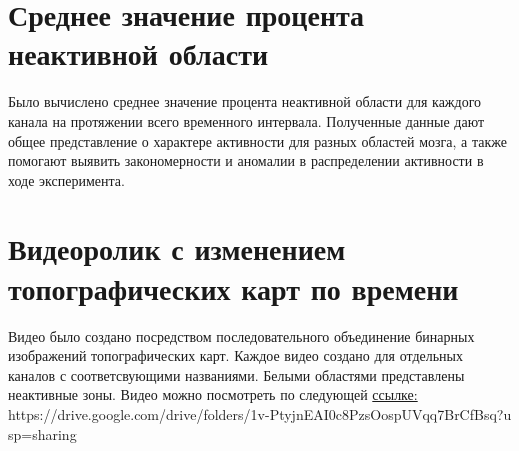 \section{Среднее значение процента неактивной области}
Было вычислено среднее значение процента неактивной области для каждого канала на протяжении всего временного интервала. Полученные данные дают общее представление о характере активности для разных областей мозга, а также помогают выявить закономерности и аномалии в распределении активности в ходе эксперимента.



\section{Видеоролик с изменением топографических карт по времени}
Видео было создано посредством последовательного объединение бинарных изображений топографических карт. Каждое видео создано для отдельных каналов с соответсвующими названиями. Белыми областями представлены неактивные зоны.
\newline
Видео можно посмотреть по следующей \href{https://drive.google.com/drive/folders/1v-PtyjnEAI0c8PzsOospUVqq7BrCfBsq?usp=sharing}{ссылке:}
\newline
https://drive.google.com/drive/folders/1v-PtyjnEAI0c8PzsOospUVqq7BrCfBsq?u
sp=sharing

\endinput